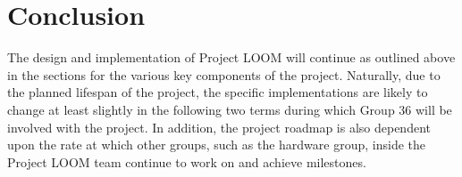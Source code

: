 \documentclass[onecolumn, draftclsnofoot,10pt, compsoc]{IEEEtran}
\begin{document}
\section{Conclusion}
    The design and implementation of Project LOOM will continue as outlined above in the sections for the various key components of the project. Naturally, due to the planned lifespan of the project, the specific implementations are likely to change at least slightly in the following two terms during which Group 36 will be involved with the project. In addition, the project roadmap is also dependent upon the rate at which other groups, such as the hardware group, inside the Project LOOM team continue to work on and achieve milestones. 





\end{document}

